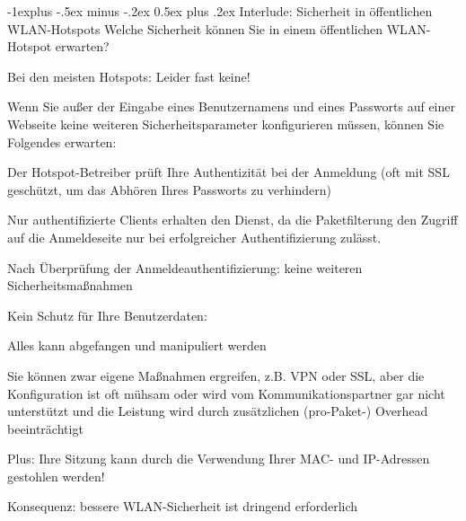 \documentclass[a4paper]{article}
\makeatletter
\renewcommand{\subsection}{\@startsection{subsection}{2}{0mm}%
 {-1explus -.5ex minus -.2ex}%
 {0.5ex plus .2ex}%
 {\normalfont\normalsize\bfseries}}
\makeatother
\begin{document}
\begin{multicols}{3}
      \subsection{Interlude: Sicherheit in öffentlichen WLAN-Hotspots}
      Welche Sicherheit können Sie in einem öffentlichen WLAN-Hotspot erwarten?
      \begin{itemize*}
            \item Bei den meisten Hotspots: Leider fast keine!
            \item Wenn Sie außer der Eingabe eines Benutzernamens und eines Passworts auf einer Webseite keine weiteren Sicherheitsparameter konfigurieren müssen, können Sie Folgendes erwarten:
            \begin{itemize*}
                  \item Der Hotspot-Betreiber prüft Ihre Authentizität bei der Anmeldung (oft mit SSL geschützt, um das Abhören Ihres Passworts zu verhindern)
                  \item Nur authentifizierte Clients erhalten den Dienst, da die Paketfilterung den Zugriff auf die Anmeldeseite nur bei erfolgreicher Authentifizierung zulässt.
                  \item Nach Überprüfung der Anmeldeauthentifizierung: keine weiteren Sicherheitsmaßnahmen
                  \item Kein Schutz für Ihre Benutzerdaten:
                  \begin{itemize*}
                        \item Alles kann abgefangen und manipuliert werden
                        \item Sie können zwar eigene Maßnahmen ergreifen, z.B. VPN oder SSL, aber die Konfiguration ist oft mühsam oder wird vom Kommunikationspartner gar nicht unterstützt und die Leistung wird durch zusätzlichen (pro-Paket-) Overhead beeinträchtigt
                  \end{itemize*}
                  \item Plus: Ihre Sitzung kann durch die Verwendung Ihrer MAC- und IP-Adressen gestohlen werden!
            \end{itemize*}
            \item Konsequenz: bessere WLAN-Sicherheit ist dringend erforderlich
      \end{itemize*}


\end{multicols}
\end{document}
